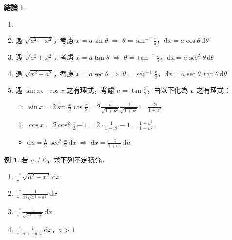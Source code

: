 \documentclass[12pt]{extarticle}
\newcommand{\ds}{\displaystyle}
\newcommand{\ie}{\;\Longrightarrow\;}
\theoremstyle{definition}
\newtheorem*{fact}{結論}
\newtheorem*{ex}{例}
\begin{document}
\begin{fact}
  \begin{enumerate}\setlength{\itemsep}{0pt}
    \item[]
    \item 遇 $\ds\sqrt{a^2 - x^2}$，考慮 $\ds x = a\sin\theta \ie \theta = \sin^{-1}\frac{x}{a}$，$\ds\text{d}x = a\cos\theta\,\text{d}\theta$ 
    \item 遇 $\ds\sqrt{a^2 + x^2}$，考慮 $\ds x = a\tan\theta \ie \theta = \tan^{-1}\frac{x}{a}$，$\ds\text{d}x = a\sec^2\theta\,\text{d}\theta$
    \item 遇 $\ds\sqrt{x^2 - a^2}$，考慮 $\ds x = a\sec\theta \ie \theta = \sec^{-1}\frac{x}{a}$，$\ds\text{d}x = a\sec\theta\,\tan\theta\,\text{d}\theta$
    \item 遇 $\ds\sin x$、$\ds\cos x$ 之有理式，考慮 $\ds u = \tan\frac{x}{2}$，由以下化為 $u$ 之有理式：
      \begin{itemize}\setlength{\itemsep}{0pt}
        \item $\ds\sin x = 2\sin\frac{x}{2}\cos\frac{x}{2} = 2\frac{u}{\sqrt{1 + u^2}}\frac{1}{\sqrt{1 + u^2}} = \frac{2 u}{1 + u^2}$
        \item $\ds\cos x = 2\cos^2\frac{x}{2} - 1 = 2\cdot\frac{1}{1 + u^2} - 1 = \frac{1 - u^2}{1 + u^2}$
        \item $\ds\text{d}u = \frac{1}{2}\,\sec^2\frac{x}{2}\,\text{d}x \ie \text{d}x = \frac{2}{1 + u^2}\,\text{d}u$
      \end{itemize}
  \end{enumerate}
\end{fact}

\begin{ex} 若 $a\ne 0$，求下列不定積分。
  \begin{enumerate}\setlength{\itemsep}{0pt}
    \item $\ds\int\!\sqrt{a^2 - x^2}\,\text{d}x$
    \item $\ds\int\!\frac{1}{x^2\sqrt{x^2 + a^2}}\,\text{d}x$
    \item $\ds\int\!\frac{1}{\sqrt{x^2 - a^2}}\,\text{d}x$
    \item $\ds\int\!\frac{1}{a + \sin x}\,\text{d}x$，$a > 1$
  \end{enumerate}
\end{ex}
\end{document}
